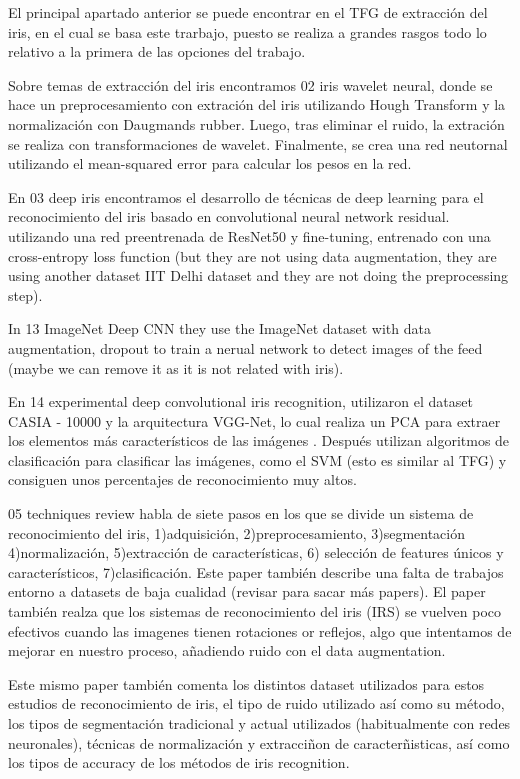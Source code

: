 
El principal apartado anterior se puede  encontrar en el TFG de extracción del iris, en el cual se basa este trarbajo, puesto se realiza a grandes rasgos
todo lo relativo a la primera de las opciones del trabajo.

Sobre temas de extracción del iris encontramos 02 iris wavelet neural, donde se hace un preprocesamiento con extración del iris utilizando Hough Transform y la 
normalización con Daugmands rubber. Luego, tras eliminar el ruido, la extración se realiza con transformaciones de wavelet. Finalmente, se crea una red neutornal
utilizando el mean-squared error para calcular los pesos en la red.

En 03 deep iris encontramos el desarrollo de técnicas de deep learning para el reconocimiento del iris basado en convolutional neural network residual. utilizando una red preentrenada 
de ResNet50 y fine-tuning, entrenado con una cross-entropy loss function (but they are not using data augmentation, they are using another dataset IIT Delhi dataset and they are 
not doing the preprocessing step).

In 13 ImageNet Deep CNN they use the ImageNet dataset with data augmentation, dropout to train a nerual network to detect images of the feed (maybe we can remove it as
it is not related with iris).

En 14 experimental deep convolutional iris recognition, utilizaron el dataset CASIA - 10000 y la arquitectura VGG-Net, lo cual realiza un PCA para extraer los elementos
más característicos de las imágenes . Después utilizan algoritmos de clasificación para clasificar las imágenes, como el SVM (esto es similar al TFG) y consiguen unos percentajes
de reconocimiento muy altos.

05 techniques review habla de siete pasos en los que se divide un sistema de reconocimiento del iris, 1)adquisición, 2)preprocesamiento, 3)segmentación
 4)normalización, 5)extracción de características, 6) selección de features únicos y característicos, 7)clasificación. Este paper también describe una falta de
 trabajos entorno a datasets de baja cualidad (revisar para sacar más papers). El paper también realza que los sistemas de reconocimiento del iris (IRS) se vuelven 
 poco efectivos cuando las imagenes tienen rotaciones or reflejos, algo que intentamos de mejorar en nuestro proceso, añadiendo ruido con el data augmentation.

 Este mismo paper también comenta los distintos dataset utilizados para estos estudios de reconocimiento de iris, el tipo de ruido utilizado así como su método,
 los tipos de segmentación tradicional y actual utilizados (habitualmente con redes neuronales), técnicas de normalización y extracciñon de caracterñisticas, así 
 como los tipos de accuracy de los métodos de iris recognition.

